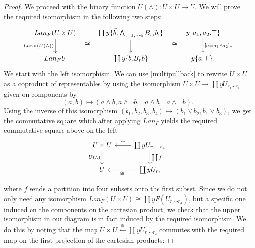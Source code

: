 \documentclass[a4paper]{amsproc}
\theoremstyle{plain}
\theoremstyle{definition}
\theoremstyle{remark}
\numberwithin{equation}{section}
\begin{document}
\begin{proof}
We proceed with the binary function $U(\wedge): U \times U \to U$. We will prove the required isomorphism in the following two steps:
\[
\begin{tikzcd}
Lan_F(U \times U) \arrow[d, "Lan_F(U(\wedge))"'] \arrow[r, phantom, shift right=7, "\cong"] & {\coprod y \{\vec{b}.\bigwedge_{i=1,\cdots 4} B_{r_i} b_i\}} \arrow[d] \arrow[r, phantom, shift right=7, "\cong"] & {y \{a_1,a_2.\top\}} \arrow[d, "{[a = a_1 \wedge a_2]_*}"] \\
Lan_F U                                          & \coprod y \{b.B_rb\} & y\{a.\top\} .
\end{tikzcd}
\]
We start with the left isomorphism. We can use \ref{multipullback} to rewrite $U \times U$ as a coproduct of representables by using the isomorphism $U \times U \to \coprod y U_{r_1 \cdots r_4}$ given on components by 
\[
(a,b) \mapsto (a \wedge b, a \wedge \neg b, \neg a \wedge b, \neg a \wedge \neg b) .
\]
Using the inverse of this isomorphism $(b_1,b_2,b_3,b_4) \mapsto (b_1 \vee b_2, b_1 \vee b_3)$, we get the commutative square which after applying $Lan_F$ yields the required commutative square above on the left
\[
\begin{tikzcd}
U \times U \arrow[d, "U(\wedge)"'] & \coprod y U_{r_1 \cdots r_4} \arrow[d, "\coprod f"] \arrow[l, "\cong"'] \\
U                                  & \coprod y U_r \arrow[l, "\cong"]                          ,
\end{tikzcd}
\]

where $f$ sends a partition into four subsets onto the first subset. Since we do not only need any isomorphism $Lan_F (U \times U) \cong \coprod y F (U_{r_1 \cdots r_4})$, but a specific one induced on the components on the cartesian product, we check that the upper isomorphism in our diagram is in fact induced by the required isomorphism. We do this by noting that the map $U \times U \xleftarrow{\cong} \coprod y U_{r_1 \cdots r_4}$ commutes with the required map on the first projection of the cartesian products:


\end{proof}
\end{document}
